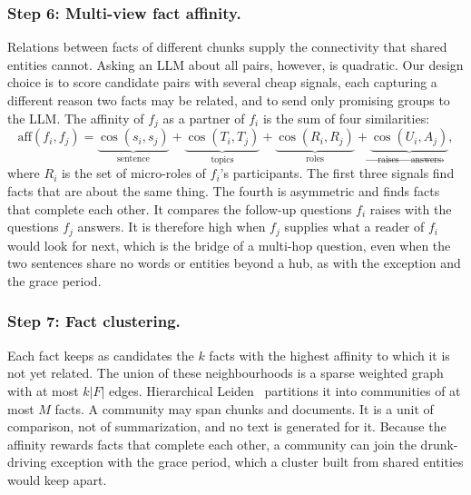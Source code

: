 \documentclass[sigconf, review, anonymous]{acmart}
\newcommand{\simcos}{\operatorname{cos}}
\begin{document}
\subsubsection*{Step 6: Multi-view fact affinity.}
Relations between facts of different chunks supply the connectivity that shared entities cannot. Asking an LLM about all pairs, however, is quadratic. Our design choice is to score candidate pairs with several cheap signals, each capturing a different reason two facts may be related, and to send only promising groups to the LLM. The affinity of $f_j$ as a partner of $f_i$ is the sum of four similarities:
\[
  \mathrm{aff}(f_i, f_j) =
  \underbrace{\simcos(s_i, s_j)}_{\text{sentence}} +
  \underbrace{\simcos(T_i, T_j)}_{\text{topics}} +
  \underbrace{\simcos(R_i, R_j)}_{\text{roles}} +
  \underbrace{\simcos(U_i, A_j)}_{\text{raises}\,\to\,\text{answers}},
\]
where $R_i$ is the set of micro-roles of $f_i$'s participants. The first three signals find facts that are about the same thing. The fourth is asymmetric and finds facts that complete each other. It compares the follow-up questions $f_i$ raises with the questions $f_j$ answers. It is therefore high when $f_j$ supplies what a reader of $f_i$ would look for next, which is the bridge of a multi-hop question, even when the two sentences share no words or entities beyond a hub, as with the exception and the grace period.

\subsubsection*{Step 7: Fact clustering.}
Each fact keeps as candidates the $k$ facts with the highest affinity to which it is not yet related. The union of these neighbourhoods is a sparse weighted graph with at most $k|F|$ edges. Hierarchical Leiden~\cite{traag2019leiden} partitions it into communities of at most $M$ facts. A community may span chunks and documents. It is a unit of comparison, not of summarization, and no text is generated for it. Because the affinity rewards facts that complete each other, a community can join the drunk-driving exception with the grace period, which a cluster built from shared entities would keep apart.
\end{document}
